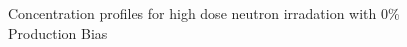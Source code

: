\documentclass[a4paper]{article}
\begin{document}
    \begin{figure}[h!]  %
      \centering
      \qquad
      \caption{Concentration profiles for high dose neutron irradation with 0\% Production Bias}
      \label{figure:concentrations_neutron_0_1e-3}
    \end{figure}
\end{document}
